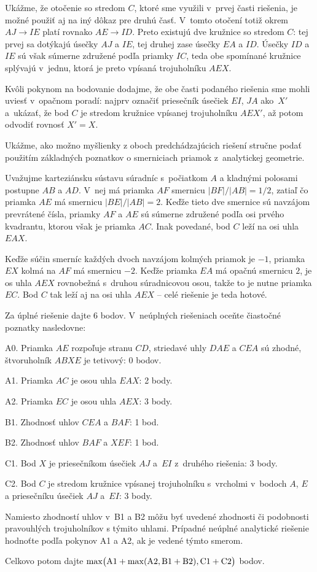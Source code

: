 {\poznamky
Ukážme, že otočenie so stredom $C$, ktoré sme
využili v~prvej časti riešenia, je možné použiť aj na iný dôkaz
pre druhú časť. V~tomto otočení totiž okrem $AJ\to IE$ platí rovnako
$AE\to ID$. Preto existujú dve kružnice so stredom $C$: tej prvej
sa dotýkajú úsečky $AJ$ a $IE$, tej druhej zase úsečky $EA$ a $ID$.
Úsečky $ID$ a $IE$ sú však súmerne združené podľa
priamky $IC$, teda obe spomínané kružnice splývajú v~jednu, ktorá
je preto vpísaná trojuholníku $AEX$.

Kvôli pokynom na bodovanie dodajme, že obe časti
podaného riešenia sme mohli uviesť v~opačnom poradí: najprv
označiť priesečník úsečiek $EI$, $JA$ ako~$X'$ a~ukázať, že bod $C$
je stredom kružnice vpísanej trojuholníku $AEX'$, až potom odvodiť
rovnosť $X'=X$.

\ineriesenie
Ukážme, ako možno myšlienky z oboch predchádzajúcich riešení
stručne podať použitím základných poznatkov o smerniciach priamok
z~analytickej geometrie.

Uvažujme karteziánsku sústavu súradníc s~počiatkom
$A$ a kladnými polosami postupne $AB$ a $AD$. V~nej má priamka $AF$
smernicu $|BF|/|AB|= 1/2$, zatiaľ čo
priamka $AE$ má smernicu $|BE|/|AB| = 2$. Keďže tieto
dve smernice sú navzájom prevrátené čísla, priamky $AF$ a
$AE$ sú súmerne združené podľa osi prvého kvadrantu, ktorou
však je priamka $AC$. Inak povedané, bod $C$ leží na osi uhla $EAX$.

Keďže súčin smerníc každých dvoch navzájom kolmých priamok je ${-1}$,
priamka $EX$ kolmá na $AF$ má smernicu ${-2}$. Keďže priamka $EA$
má opačnú smernicu $2$, je os uhla $AEX$ rovnobežná s~druhou
súradnicovou osou, takže to je nutne priamka $EC$. Bod $C$ tak
leží aj na osi uhla $AEX$ -- celé riešenie je teda hotové.

\schemaABC
Za úplné riešenie dajte 6 bodov. V~neúplných riešeniach oceňte
čiastočné poznatky nasledovne:
\item{A0.} Priamka $AE$ rozpoľuje stranu $CD$, striedavé uhly $DAE$ a $CEA$ sú zhodné, štvoruholník $ABXE$ je tetivový: 0 bodov.
\item{A1.} Priamka $AC$ je osou uhla $EAX$: 2 body.
\item{A2.} Priamka $EC$ je osou uhla $AEX$: 3 body.
\item{B1.} Zhodnosť uhlov $CEA$ a $BAF$: 1 bod.
\item{B2.} Zhodnosť uhlov $BAF$ a $XEF$: 1 bod.
\item{C1.} Bod $X$ je priesečníkom úsečiek $AJ$ a~$EI$ z~druhého riešenia: 3 body.
\item{C2.} Bod $C$ je stredom kružnice vpísanej trojuholníku s~vrcholmi v~bodoch $A$,
$E$ a priesečníku úsečiek $AJ$ a~$EI$: 3 body.

\noindent
Namiesto zhodností uhlov v~B1 a B2 môžu byť uvedené zhodnosti či
podobnosti pravouhlých trojuholníkov s týmito uhlami. Prípadné neúplné
analytické riešenie hodnoťte podľa pokynov A1 a A2,
ak je vedené týmto smerom.

Celkovo potom dajte $\rm\max\bigl(A1+\max(A2,B1+B2),C1+C2\bigr)$ bodov.
\endschema
}

